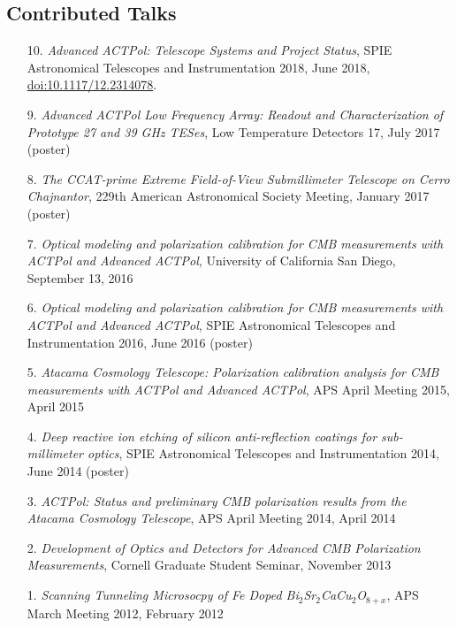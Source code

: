 \documentclass[margin,line]{res}
\begin{document}
\begin{resume}
\section{\sc Contributed Talks} 
\begin{enumerate}
    \item[{10.}] {\it Advanced ACTPol: Telescope Systems and Project Status},
      SPIE Astronomical Telescopes and Instrumentation 2018, June 2018,
      \href{https://www.spiedigitallibrary.org/conference-proceedings-of-spie/10708/107081E/Advanced-ACTPol-telescope-systems-and-project-sStatus-Conference-Presentation/10.1117/12.2314078.full?SSO=1}{doi:10.1117/12.2314078}.
    \item[{9.}] {\it Advanced ACTPol Low Frequency Array: Readout and Characterization of Prototype 27 and 39 GHz TESes},
      Low Temperature Detectors 17, July 2017 (poster)
    \item[{8.}] {\it The CCAT-prime Extreme Field-of-View Submillimeter Telescope on Cerro Chajnantor},
      229th American Astronomical Society Meeting, January 2017 (poster)
    \item[{7.}] {\it Optical modeling and polarization calibration for CMB measurements with ACTPol and Advanced ACTPol},
      University of California San Diego, September 13, 2016
    \item[{6.}] {\it Optical modeling and polarization calibration for CMB measurements with ACTPol and Advanced ACTPol},
      SPIE Astronomical Telescopes and Instrumentation 2016, June 2016 (poster)
    \item[{5.}] {\it Atacama Cosmology Telescope: Polarization calibration analysis for CMB measurements with ACTPol and Advanced ACTPol},
      APS April Meeting 2015, April 2015
    \item[{4.}] {\it Deep reactive ion etching of silicon anti-reflection coatings for sub-millimeter optics},
      SPIE Astronomical Telescopes and Instrumentation 2014, June 2014 (poster)
    \item[{3.}] {\it ACTPol: Status and preliminary CMB polarization results from the Atacama Cosmology Telescope},
      APS April Meeting 2014, April 2014
    \item[{2.}] {\it Development of Optics and Detectors for Advanced CMB Polarization Measurements},
      Cornell Graduate Student Seminar, November 2013
    \item[{1.}] {\it Scanning Tunneling Microsocpy of Fe Doped Bi$_2$Sr$_2$CaCu$_2$O$_{8+x}$},
      APS March Meeting 2012, February 2012
\end{enumerate}


\end{resume}
\end{document}
